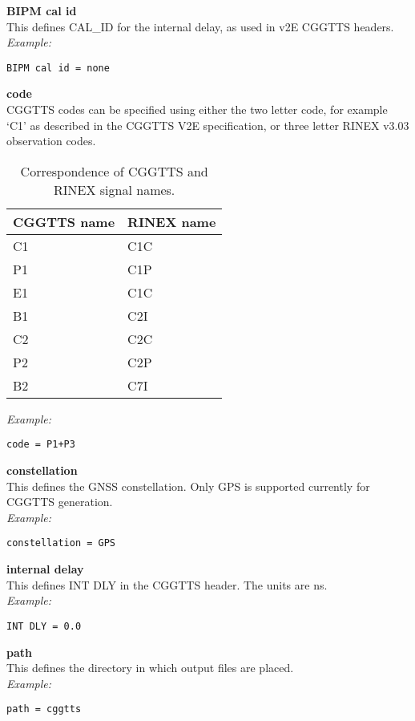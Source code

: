 {\bfseries BIPM cal id}\\
This defines CAL\_ID for the internal delay, as used in v2E CGGTTS headers.\\
\textit{Example:}
\begin{lstlisting}
BIPM cal id = none
\end{lstlisting}

{\bfseries code}\\

CGGTTS codes can be specified using either the two letter code, for example `C1' as described in the CGGTTS V2E 
specification, or three letter RINEX v3.03 observation codes.
\begin{table}
\begin{tabular}{ll}
	CGGTTS name	 & RINEX name \\ \hline
	C1 & C1C \\
	P1 & C1P \\
	E1 & C1C \\
	B1 & C2I \\
	C2 & C2C \\
	P2 & C2P \\
	B2 & C7I 
\end{tabular}
\caption{Correspondence of CGGTTS and RINEX signal names.}
\end{table}
\textit{Example:}
\begin{lstlisting}
code = P1+P3
\end{lstlisting}

{\bfseries constellation}\\
This defines the GNSS constellation. Only GPS is supported currently for CGGTTS generation.\\
\textit{Example:}
\begin{lstlisting}
constellation = GPS
\end{lstlisting}

{\bfseries internal delay}\\
This defines INT DLY in the CGGTTS header. The units are ns.\\
\textit{Example:}
\begin{lstlisting}
INT DLY = 0.0
\end{lstlisting}

{\bfseries path}\\
This defines the directory in which output files are placed.\\
\textit{Example:}
\begin{lstlisting}
path = cggtts
\end{lstlisting}

